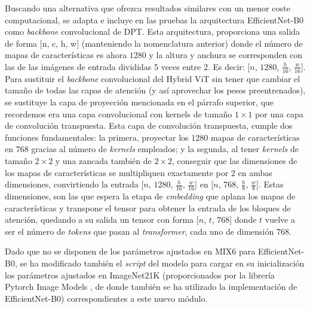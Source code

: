 Buscando una alternativa que ofrezca resultados similares con un menor coste computacional, se adapta e incluye en las pruebas la arquitectura EfficientNet-B0 como \textit{backbone} convolucional de DPT. Esta arquitectura, proporciona una salida de forma [n, c, h, w] (manteniendo la nomenclatura anterior) donde el número de mapas de características es ahora $1280$ y la altura y anchura se corresponden con las de las imágenes de entrada divididas 5 veces entre 2. Es decir: [$n$, $1280$, $\frac{h}{16}$, $\frac{w}{16}$]. Para sustituir el \textit{backbone} convolucional del Hybrid ViT sin tener que cambiar el tamaño de todas las capas de atención (y así aprovechar los pesos preentrenados), se sustituye la capa de proyección mencionada en el párrafo superior, que recordemos era una capa convolucional con kernels de tamaño $1\times1$ por una capa de convolución transpuesta. Esta capa de convolución transpuesta, cumple dos funciones fundamentales: la primera, proyectar los $1280$ mapas de características en $768$ gracias al número de \textit{kernels} empleados; y la segunda, al tener \textit{kernels} de tamaño $2\times2$ y una zancada también de $2\times2$, conseguir que las dimensiones de los mapas de características se multipliquen exactamente por $2$ en ambas dimensiones, convirtiendo la entrada [$n$, $1280$, $\frac{h}{16}$, $\frac{w}{16}$] en [$n$, $768$, $\frac{h}{8}$, $\frac{w}{8}$]. Estas dimensiones, son las que espera la etapa de \textit{embedding} que aplana los mapas de características y transpone el tensor para obtener la entrada de los bloques de atención, quedando a su salida un tensor con forma [$n$, $t$, $768$] donde $t$ vuelve a ser el número de \textit{tokens} que pasan al \textit{transformer}, cada uno de dimensión $768$.

Dado que no se disponen de los parámetros ajustados en MIX6 para EfficientNet-B0, se ha modificado también el \textit{script} del modelo para cargar en su inicialización los parámetros ajustados en ImageNet21K (proporcionados por la librería Pytorch Image Models \cite{timm}, de donde también se ha utilizado la implementación de EfficientNet-B0) correspondientes a este nuevo módulo. 




\clearpage